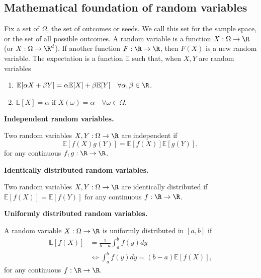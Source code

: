
%
%

\subsection{Mathematical foundation of random variables}\label{app:stochastic_maths}
Fix a set of $\Omega$, the set of outcomes or seeds. We call this set for the sample space, or the set of all possible outcomes. A random variable is a function $X:\Omega \to\R$ (or $X:\Omega\to\R^d$). If another function $F: \R\to\R$, then $F(X)$ is a new random variable. The expectation is a function $\mathbb{E}$ such that, when $X, Y$ are random variables
\begin{enumerate}
    \item $\mathbb{E}[\alpha X + \beta Y] = \alpha\mathbb{E}[X]+\beta\mathbb{E}[Y] \quad \forall \alpha, \beta \in\R$.
    \item $\mathbb{E}[X]=\alpha \text{ if } X(\omega) = \alpha\quad \forall\omega\in\Omega. $
\end{enumerate}

\textbf{Independent random variables.}

Two random variables $X, Y: \Omega\to\R$ are independent if 
\begin{equation*}
    \mathbb{E}[f(X)g(Y)] = \mathbb{E}[f(X)]\mathbb{E}[g(Y)], 
\end{equation*}
for any continuous $f, g: \R\to\R$. 

\textbf{Identically distributed random variables.}

Two random variables $X,Y:\Omega\to\R$ are identically distributed if $\mathbb{E}[f(X)] = \mathbb{E}[f(Y)]$ for any continuous $f:\R\to\R$. 

\textbf{Uniformly distributed random variables.}

A random variable $X:\Omega\to\R$ is uniformly distributed in $[a,b]$ if 
\begin{equation*}
    \begin{split}
        \mathbb{E}[f(X)] &= \frac{1}{b-a}\int_a^bf(y)dy \\ 
        &\Leftrightarrow \int_a^b f(y)dy = (b-a)\mathbb{E}[f(X)], 
    \end{split}
\end{equation*}
for any continuous $f:\R\to\R$.

